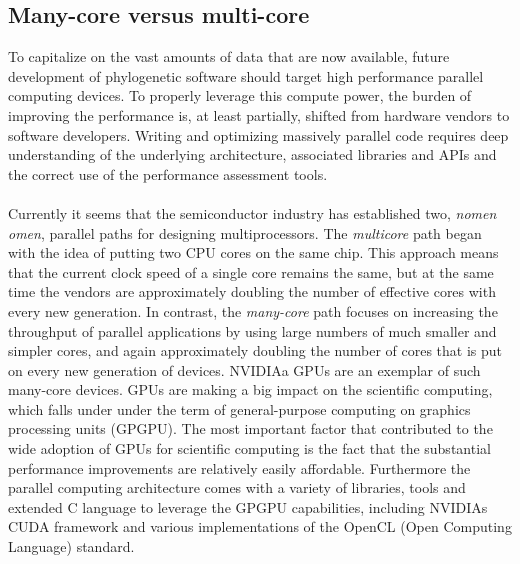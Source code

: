 \subsection{Many-core versus multi-core}

To capitalize on the vast amounts of data that are now available, future development of phylogenetic software should target high performance parallel computing devices.
To properly leverage this compute power, the burden of improving the performance is, at least partially, shifted from hardware vendors to software developers.
Writing and optimizing massively parallel code requires deep understanding of the underlying architecture, associated libraries and APIs and the correct use of the performance assessment tools.

\paragraph{}
Currently it seems that the semiconductor industry has established two, \textit{nomen omen}, parallel paths for designing multiprocessors.
The \textit{multicore} path began with the idea of putting two CPU cores on the same chip.
This approach means that the current clock speed of a single core remains the same, but at the same time the vendors are approximately doubling the number of effective cores with every new generation.
In contrast, the \textit{many-core} path focuses on increasing the throughput of parallel applications by using large numbers of much smaller and simpler cores, and again approximately doubling the number of cores that is put on every new generation of devices. 
NVIDIAa GPUs are an exemplar of such many-core devices.
GPUs \citep{Nickolls2008} are making a big impact on the scientific computing, which falls under under the term of general-purpose computing on graphics processing units (GPGPU).
The most important factor that contributed to the wide adoption of GPUs for scientific computing is the fact that the substantial performance improvements are  relatively easily affordable. 
Furthermore the parallel computing architecture comes with a variety of libraries, tools and extended C language to leverage the GPGPU capabilities, including NVIDIAs CUDA framework and various implementations of the OpenCL (Open Computing Language) standard.

